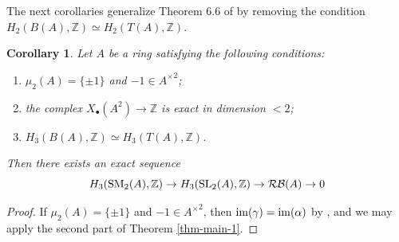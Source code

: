 \documentclass[11pt]{amsart}
\theoremstyle{definition}
\theoremstyle{plain}
\newtheorem{cor}[ntn]{Corollary}
\theoremstyle{definition}
\numberwithin{equation}{section}
\newcommand{\z}{\mathbb{Z}}
\newcommand{\RB}{\mathcal{RB}}
\renewcommand{\aa}{{A^\times}}
\newcommand{\SL}{\mathit{{\rm SL}}}
\newcommand{\SM}{\mathit{{\rm SM}}}
\newcommand{\im}{{\rm im}}
\begin{document}
	The next corollaries generalize Theorem 6.6 of \cite{B-E--2023} by removing the condition $H_2(B(A),\z)\simeq H_2(T(A),\z)$. 
	\begin{cor}
		Let $A$ be a ring satisfying the following conditions:
		\begin{enumerate}
			\item $\mu_2(A)=\{\pm 1\}$ and $-1\in\aa^2$;
			\item the complex $X_\bullet(A^2)\to\z$ is exact in dimension $<2$;
			\item $H_3(B(A),\z)\simeq H_3(T(A),\z)$.
		\end{enumerate}
		Then there exists an exact sequence
		\[
		H_3(\SM_2(A),\z)\to H_3(\SL_2(A),\z)\to \RB(A)\to 0
		\]
	\end{cor}
	\begin{proof}
		If $\mu_2(A)=\{\pm 1\}$ and $-1\in\aa^2$, then $\im(\gamma)=\im(\alpha)$ by \cite[Corollary 6.4]{B-E--2023}, and we may apply the second part of Theorem \ref{thm-main-1}.
	\end{proof}
	
\end{document}
